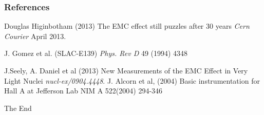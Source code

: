 \documentclass{beamer}
\begin{document}

\begin{frame}
\frametitle{References}
\footnotesize{
\begin{thebibliography}{99} %
 Douglas Higinbotham (2013) 
\newblock The EMC effect still puzzles after 30 years
\newblock \emph{Cern Courier} April 2013.

 J. Gomez et al. (SLAC-E139)  
\newblock \emph{Phys. Rev D}  49 (1994) 4348 

 J.Seely, A. Daniel et al (2013) 
\newblock New Measurements of the EMC Effect in Very Light Nuclei
\newblock \emph{nucl-ex/0904.4448}.
 J. Alcorn et al, (2004)
\newblock Basic instrumentation for Hall A at Jefferson Lab
\newblock NIM A 522(2004) 294-346

\end{thebibliography}
}
\end{frame}

\begin{frame}
\Huge{\centerline{The End}}
\end{frame}

\end{document}
